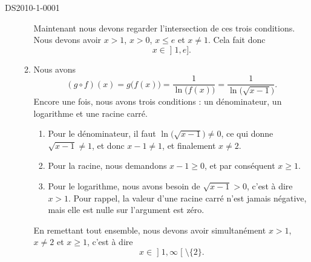 \begin{corrige}{DS2010-1-0001}
\begin{enumerate}
\begin{enumerate}
\begin{enumerate}
					\end{enumerate}
					Maintenant nous devons regarder l'intersection de ces trois conditions. Nous devons avoir $x>1$, $x>0$, $x\leq e$ et $x\neq 1$. Cela fait donc
					\begin{equation}
						x\in\mathopen] 1 , e \mathclose].
					\end{equation}
				\item
					Nous avons
					\begin{equation}
						(g\circ f)(x)=g\big( f(x) \big)=\frac{1}{ \ln\big( f(x) \big) }=\frac{1}{ \ln\big( \sqrt{x-1} \big) }.
					\end{equation}
					Encore une fois, nous avons trois conditions : un dénominateur, un logarithme et une racine carré.
					\begin{enumerate}
						\item
							Pour le dénominateur, il faut $\ln\big( \sqrt{x-1} \big)\neq 0$, ce qui donne $\sqrt{x-1}\neq 1$, et donc $x-1\neq 1$, et finalement $x\neq 2$.
						\item
							Pour la racine, nous demandons $x-1\geq 0$, et par conséquent $x\geq 1$.
						\item
							Pour le logarithme, nous avons besoin de $\sqrt{x-1}>0$, c'est à dire $x> 1$. Pour rappel, la valeur d'une racine carré n'est jamais négative, mais elle est nulle sur l'argument est zéro.
					\end{enumerate}
					En remettant tout ensemble, nous devons avoir simultanément $x> 1$, $x\neq 2$ et $x\geq 1$, c'est à dire
					\begin{equation}
						x\in\mathopen] 1 , \infty \mathclose[\setminus\{ 2 \}.
					\end{equation}
					
			\end{enumerate}
	\end{enumerate}

\end{corrige}
